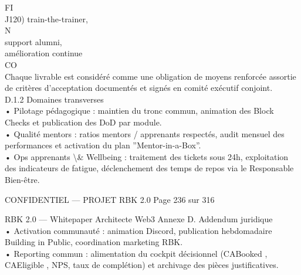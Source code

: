 \documentclass[12pt,landscape,a4paper]{article}
\newenvironment{confidential}
{\begin{tcolorbox}[
    colback=rbkred!5!white,
    colframe=rbkred!75!black,
    title=CONFIDENTIEL,
    fonttitle=\bfseries\color{white},
    coltitle=rbkred!75!black,
    breakable,
    enhanced,
    frame hidden,
    borderline west={2pt}{0pt}{rbkred!75!black}
]}
{\end{tcolorbox}}
\begin{document}
FI\\
J120)                 train-the-trainer,\\
\vspace{0.5em}
\vspace{0.5em}
\vspace{0.5em}
N\\
support alumni,\\
amélioration continue\\
CO\\
Chaque livrable est considéré comme une obligation de moyens renforcée assortie de critères d’acceptation documentés et signés en comité exécutif conjoint.\\
\vspace{0.5em}
\vspace{0.5em}
D.1.2 Domaines transverses\\
• Pilotage pédagogique : maintien du tronc commun, animation des Block Checks et publication des DoD par module.\\
\vspace{0.5em}
• Qualité mentors : ratios mentors / apprenants respectés, audit mensuel des performances et activation du plan ”Mentor-in-a-Box”.\\
\vspace{0.5em}
• Ops apprenants \textbackslash{}& Wellbeing : traitement des tickets sous 24h, exploitation des indicateurs de fatigue, déclenchement des temps de repos via le Responsable\\
Bien-être.\\
\vspace{0.5em}
\vspace{0.5em}
\vspace{0.5em}
\vspace{0.5em}
\begin{confidential}CONFIDENTIEL — PROJET RBK 2.0                                            Page 236 sur 316\end{confidential}
RBK 2.0 — Whitepaper Architecte Web3                                                                                                 Annexe D. Addendum juridique\\
\vspace{0.5em}
\vspace{0.5em}
• Activation communauté : animation Discord, publication hebdomadaire Building in Public, coordination marketing RBK.\\
\vspace{0.5em}
• Reporting commun : alimentation du cockpit décisionnel (CABooked , CAEligible , NPS, taux de complétion) et archivage des pièces justificatives.\\
\end{document}
